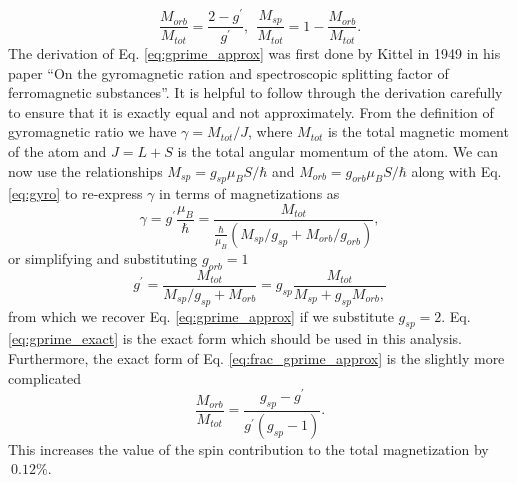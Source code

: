 \documentclass[12pt]{article}
\begin{document}
\begin{equation}
\frac{M_{orb}}{M_{tot}}=\frac{2-g^{\prime}}{g^{\prime}}, ~~\frac{M_{sp}}{M_{tot}}=1-\frac{M_{orb}}{M_{tot}}.
\label{eq:frac_gprime_approx}
\end{equation}
The derivation of Eq. \ref{eq:gprime_approx} was first done by Kittel in 1949 in his paper ``On the gyromagnetic ration and spectroscopic splitting factor of ferromagnetic substances''\cite{Kittel1949}. It is helpful to follow through the derivation carefully to ensure that it is exactly equal and not approximately. From the definition of gyromagnetic ratio we have $\gamma=M_{tot}/J$, where $M_{tot}$ is the total magnetic moment of the atom and $J=L+S$ is the total angular momentum of the atom. We can now use the relationships $M_{sp}=g_{sp}\mu_BS/\hbar$ and $M_{orb}=g_{orb}\mu_BS/\hbar$ along with Eq. \ref{eq:gyro} to re-express $\gamma$ in terms of magnetizations as
\begin{equation}
\gamma=g^{\prime}\frac{\mu_B}{\hbar}=\frac{M_{tot}}{\frac{\hbar}{\mu_B}(M_{sp}/g_{sp}+M_{orb}/g_{orb})},
\end{equation}
or simplifying and substituting $g_{orb}=1$
\begin{equation}
g^{\prime}=\frac{M_{tot}}{M_{sp}/g_{sp}+M_{orb}}=g_{sp}\frac{M_{tot}}{M_{sp}+g_{sp}M_{orb},}
\label{eq:gprime_exact}
\end{equation}
from which we recover Eq. \ref{eq:gprime_approx} if we substitute $g_{sp}=2$. Eq. \ref{eq:gprime_exact} is the exact form which should be used in this analysis. Furthermore, the exact form of Eq. \ref{eq:frac_gprime_approx} is the slightly more complicated
\begin{equation}
\frac{M_{orb}}{M_{tot}}=\frac{g_{sp}-g^{\prime}}{g^{\prime}(g_{sp}-1)}.
\label{eq:frac_gprime_exact}
\end{equation}
This increases the value of the spin contribution to the total magnetization by $~0.12\%$.
\end{document}
